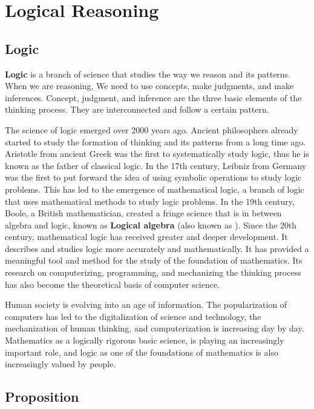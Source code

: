\documentclass{report}
\begin{document}
\onehalfspacing

\chapter{Logical Reasoning}

\section{Logic}

\textbf{Logic} is a branch of science that studies the way we reason and its patterns. When we are reasoning, We need to use concepts, make judgments, and make inferences. Concept, judgment, and inference are the three basic elements of the thinking process. They are interconnected and follow a certain pattern.

The science of logic emerged over 2000 years ago. Ancient philosophers already
started to study the formation of thinking and its patterns from a long time
ago. Aristotle from ancient Greek was the first to systematically study logic,
thus he is known as the father of classical logic. In the 17th century, Leibniz
from Germany was the first to put forward the idea of using symbolic operations
to study logic problems. This has led to the emergence of mathematical logic, a
branch of logic that uses mathematical methods to study logic problems. In the
19th century, Boole, a British mathematician, created a fringe science that is
in between algebra and logic, known as \textbf{Logical algebra} (also known as
). Since the 20th century, mathematical logic has
received greater and deeper development. It describes and studies logic more
accurately and mathematically. It has provided a meaningful tool and method for
the study of the foundation of mathematics. Its research on computerizing,
programming, and mechanizing the thinking process has also become the
theoretical basis of computer science.

Human society is evolving into an age of information. The popularization of
computers has led to the digitalization of science and technology, the
mechanization of human thinking, and computerization is increasing day by day.
Mathematics as a logically rigorous basic science, is playing an increasingly
important role, and logic as one of the foundations of mathematics is also
increasingly valued by people.

\section{Proposition}
\end{document}
